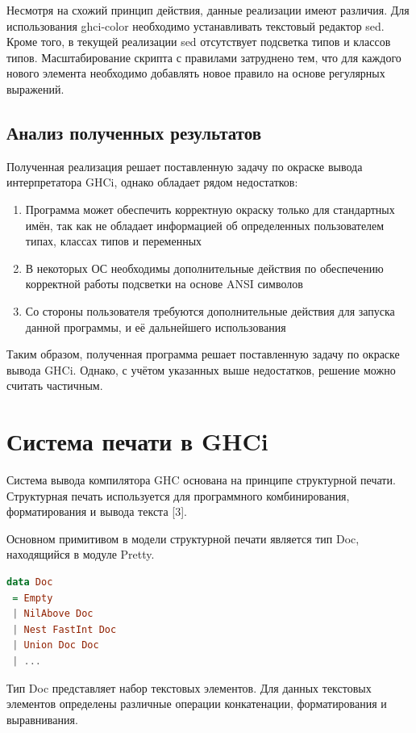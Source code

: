 Несмотря на схожий принцип действия, данные реализации имеют различия. Для использования ghci-color необходимо устанавливать текстовый редактор sed. Кроме того, в текущей реализации sed отсутствует подсветка типов и классов типов. Масштабирование скрипта с правилами затруднено тем, что для каждого нового элемента необходимо добавлять новое правило на основе регулярных выражений.

\subsection{Анализ полученных результатов}
Полученная реализация решает поставленную задачу по окраске вывода интерпретатора GHCi, однако обладает рядом недостатков:

\begin{enumerate}
\item Программа может обеспечить корректную окраску только для стандартных имён, так как не обладает информацией об определенных пользователем типах, классах типов и переменных
\item В некоторых ОС необходимы дополнительные действия по обеспечению корректной работы подсветки на основе ANSI символов
\item Со стороны пользователя требуются дополнительные действия для запуска данной программы, и её дальнейшего использования
\end{enumerate}

Таким образом, полученная программа решает поставленную задачу по окраске вывода GHCi. Однако, с учётом указанных выше недостатков, решение можно считать частичным.

\section{Система печати в GHCi}
Система вывода компилятора GHC основана на принципе структурной печати. Структурная печать используется для программного комбинирования, форматирования и вывода текста [3].

Основном примитивом в модели структурной печати является тип Doc, находящийся в модуле Pretty.
\begin{lstlisting}[language=Haskell]
data Doc
 = Empty
 | NilAbove Doc
 | Nest FastInt Doc
 | Union Doc Doc
 | ...
\end{lstlisting}

Тип Doc представляет набор текстовых элементов. Для данных текстовых элементов определены различные операции конкатенации, форматирования и выравнивания.

